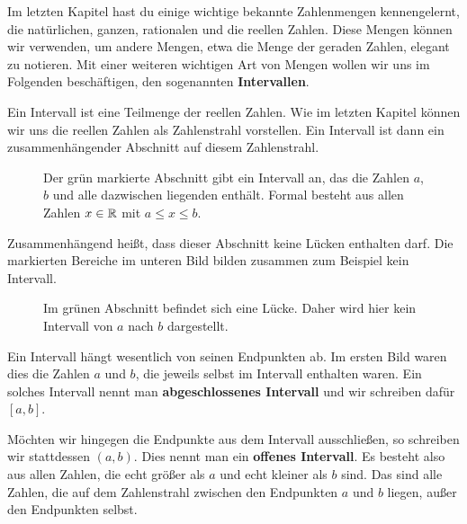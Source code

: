 \documentclass[../../main.tex]{subfiles}
\begin{document}
	Im letzten Kapitel hast du einige wichtige bekannte Zahlenmengen kennengelernt, die natürlichen, ganzen, rationalen und die reellen Zahlen. Diese Mengen können wir verwenden, um andere Mengen, etwa die Menge der geraden Zahlen, elegant zu notieren. Mit einer weiteren wichtigen Art von Mengen wollen wir uns im Folgenden beschäftigen, den sogenannten \textbf{Intervallen}.
	
	Ein Intervall ist eine Teilmenge der reellen Zahlen. Wie im letzten Kapitel können wir uns die reellen Zahlen \Real als Zahlenstrahl vorstellen. Ein Intervall ist dann ein zusammenhängender Abschnitt auf diesem Zahlenstrahl.
	
	\begin{figure}[h]
		\centering
		\caption{Der grün markierte Abschnitt gibt ein Intervall an, das die Zahlen $a$, $b$ und alle dazwischen liegenden enthält. Formal besteht aus allen Zahlen $x \in \mathbb{R}$ mit $a \leq x \leq b$.}
	\end{figure}

	Zusammenhängend heißt, dass dieser Abschnitt keine Lücken enthalten darf. Die markierten Bereiche im unteren Bild bilden zusammen zum Beispiel kein Intervall.
	
	\begin{figure}[h]
		\centering
		\caption{Im grünen Abschnitt befindet sich eine Lücke. Daher wird hier kein Intervall von $a$ nach $b$ dargestellt.}
	\end{figure}
	
	Ein Intervall hängt wesentlich von seinen Endpunkten ab. Im ersten Bild waren dies die Zahlen $a$ und $b$, die jeweils selbst im Intervall enthalten waren. Ein solches Intervall nennt man \textbf{abgeschlossenes Intervall} und wir schreiben dafür $[a,b]$. 
	
	Möchten wir hingegen die Endpunkte aus dem Intervall ausschließen, so schreiben wir stattdessen $(a,b)$. Dies nennt man ein \textbf{offenes Intervall}. Es besteht also aus allen Zahlen, die echt größer als $a$ und echt kleiner als $b$ sind. Das sind alle Zahlen, die auf dem Zahlenstrahl zwischen den Endpunkten $a$ und $b$ liegen, außer den Endpunkten selbst.
	
\end{document}
